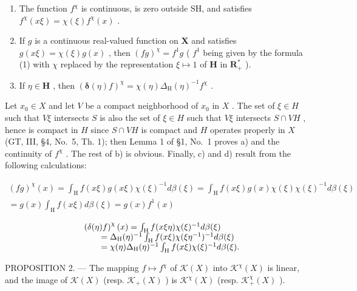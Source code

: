 \begin{enumerate}
\def\labelenumi{\alph{enumi})}
\setcounter{enumi}{1}
\item
  The function \(f^{\chi}\) is continuous, is zero outside SH, and satisfies \(f^{\chi}(x\xi) = \chi(\xi)f^{\chi}(x)\) .
\item
  If \(g\) is a continuous real-valued function on \(\mathbf{X}\) and satisfies \(g(x\xi) = \chi(\xi)g(x)\) , then \((fg)^{\chi} = f^{1}g\) ( \(f^{1}\) being given by the formula (1) with \(\chi\) replaced by the representation \(\xi \mapsto 1\) of \(\mathbf{H}\) in \(\mathbf{R}_{+}^{*}\) ).
\item
  If \(\eta \in \mathbf{H}\) , then \(\left(\pmb{\delta}(\eta)f\right)^{\chi} = \chi (\eta)\Delta_{\mathrm{H}}(\eta)^{-1}f^{\chi}\) .
\end{enumerate}

Let \(x_0 \in X\) and let \(V\) be a compact neighborhood of \(x_0\) in \(X\) . The set of \(\xi \in H\) such that \(V\xi\) intersects \(S\) is also the set of \(\xi \in H\) such that \(V\xi\) intersects \(S \cap VH\) , hence is compact in \(H\) since \(S \cap VH\) is compact and \(H\) operates properly in \(X\) (GT, III, §4, No.~5, Th. 1); then Lemma 1 of §1, No.~1 proves a) and the continuity of \(f^{\chi}\) . The rest of b) is obvious. Finally, c) and d) result from the following calculations:

\[
\begin{array}{c} (f g) ^ {\chi} (x) = \int_ {\mathrm{H}} f (x \xi) g (x \xi) \chi (\xi) ^ {- 1} d \beta (\xi) = \int_ {\mathrm{H}} f (x \xi) g (x) \chi (\xi) \chi (\xi) ^ {- 1} d \beta (\xi) \\ = g (x) \int_ {\mathrm{H}} f (x \xi) d \beta (\xi) = g (x) f ^ {1} (x) \end{array}
\]

\[
\begin{array}{r l} & {\left(\delta (\eta) f\right) ^ {\chi} (x) = \int_ {\mathrm{H}} f (x \xi \eta) \chi (\xi) ^ {- 1} d \beta (\xi)} \\ & {\qquad = \Delta_ {\mathrm{H}} (\eta) ^ {- 1} \int_ {\mathrm{H}} f (x \xi) \chi (\xi \eta^ {- 1}) ^ {- 1} d \beta (\xi)} \\ & {\qquad = \chi (\eta) \Delta_ {\mathrm{H}} (\eta) ^ {- 1} \int_ {\mathrm{H}} f (x \xi) \chi (\xi) ^ {- 1} d \beta (\xi).} \end{array}
\]

PROPOSITION 2. --- The mapping \(f \mapsto f^{\chi}\) of \(\mathcal{K}(X)\) into \(\mathcal{K}^{\chi}(X)\) is linear, and the image of \(\mathcal{K}(X)\) (resp. \(\mathcal{K}_{+}(X)\) ) is \(\mathcal{K}^{\chi}(X)\) (resp. \(\mathcal{K}_{+}^{\chi}(X)\) ).


